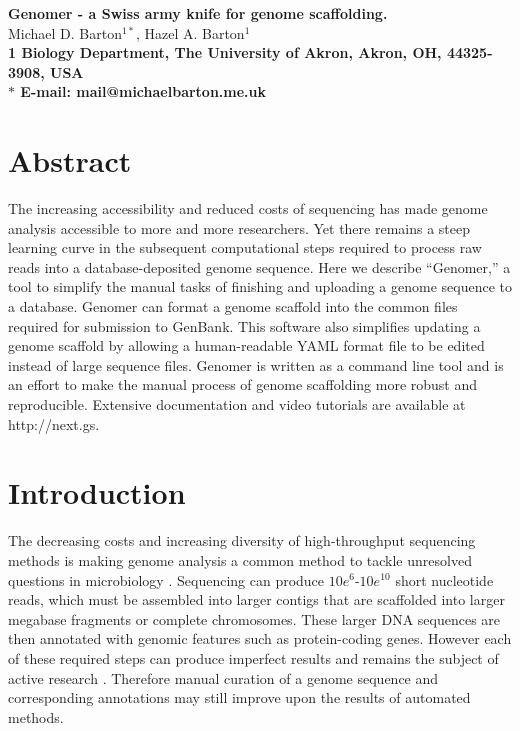 \documentclass[10pt]{article}
\date{}
\begin{document}
\begin{flushleft}
{\Large
\textbf{Genomer - a Swiss army knife for genome scaffolding.}
}
\\
Michael D. Barton$^{1\ast}$, 
Hazel A. Barton$^{1}$
\\
\bf{1} Biology Department, The University of Akron, Akron, OH, 44325-3908, USA
\\
$\ast$ E-mail: mail@michaelbarton.me.uk
\end{flushleft}

\section*{Abstract}

The increasing accessibility and reduced costs of sequencing has made genome
analysis accessible to more and more researchers. Yet there remains a steep
learning curve in the subsequent computational steps required to process raw
reads into a database-deposited genome sequence. Here we describe ``Genomer,''
a tool to simplify the manual tasks of finishing and uploading a genome
sequence to a database. Genomer can format a genome scaffold into the common
files required for submission to GenBank. This software also simplifies
updating a genome scaffold by allowing a human-readable YAML format file to be
edited instead of large sequence files. Genomer is written as a command line
tool and is an effort to make the manual process of genome scaffolding more
robust and reproducible. Extensive documentation and video tutorials are
available at http://next.gs.

\section*{Introduction}

The decreasing costs and increasing diversity of high-throughput sequencing
methods is making genome analysis a common method to tackle unresolved
questions in microbiology \cite{loman2012b}. Sequencing can produce
$10e^{6}$-$10e^{10}$ short nucleotide reads, which must be assembled into
larger contigs that are scaffolded into larger megabase fragments or complete
chromosomes. These larger DNA sequences are then annotated with genomic
features such as protein-coding genes. However each of these required steps can
produce imperfect results and remains the subject of active research
\cite{earl2011,quail2012,beckloff2012}. Therefore manual curation of a genome
sequence and corresponding annotations may still improve upon the results of
automated methods.
\end{document}
